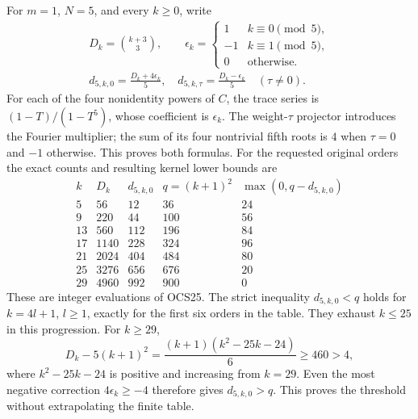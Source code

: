 \documentclass[11pt,a4paper]{article}
\begin{document}
For $m=1$, $N=5$, and every $k\geq0$, write
\[
\begin{gathered}
 D_k=\binom{k+3}{3},\qquad
 \epsilon_k=\begin{cases}1&k\equiv0\pmod5,\\-1&k\equiv1\pmod5,\\
                         0&\text{otherwise}.
             \end{cases}\\
 d_{5,k,0}=\frac{D_k+4\epsilon_k}{5},\quad
 d_{5,k,\tau}=\frac{D_k-\epsilon_k}{5}\quad(\tau\ne0).
\end{gathered}\tag{OCS25}
\]
For each of the four nonidentity powers of $C$, the trace
series is $(1-T)/(1-T^5)$, whose coefficient is $\epsilon_k$.
The weight-$\tau$ projector introduces the Fourier multiplier;
the sum of its four nontrivial fifth roots is $4$ when
$\tau=0$ and $-1$ otherwise. This proves both formulas.
For the requested original orders the exact counts and resulting
kernel lower bounds are
\[
\begin{array}{c|r|r|r|r}
 k&D_k&d_{5,k,0}&q=(k+1)^2&\max(0,q-d_{5,k,0})\\\hline
 5&56&12&36&24\\
 9&220&44&100&56\\
 13&560&112&196&84\\
 17&1140&228&324&96\\
 21&2024&404&484&80\\
 25&3276&656&676&20\\
 29&4960&992&900&0
\end{array}\tag{OCS26}
\]
These are integer evaluations of OCS25. The strict inequality
$d_{5,k,0}<q$ holds for $k=4l+1$, $l\geq1$, exactly for the
first six orders in the table. They exhaust $k\leq25$ in this
progression. For $k\geq29$,
\[
 D_k-5(k+1)^2=\frac{(k+1)(k^2-25k-24)}6\geq460>4,
\]
where $k^2-25k-24$ is positive and increasing from $k=29$.
Even the most negative correction $4\epsilon_k\geq-4$
therefore gives $d_{5,k,0}>q$. This proves the threshold
without extrapolating the finite table.
\end{document}
